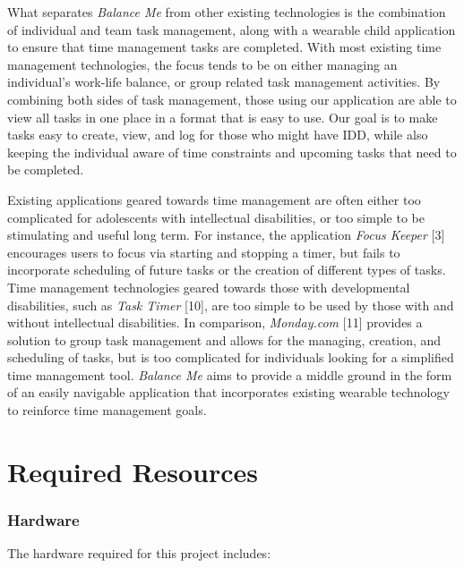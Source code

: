 \documentclass[12pt,letterpaper]{article}
\begin{document}
What separates \textit{Balance Me} from other existing technologies is the combination of individual and team task management, along with a wearable child application to ensure that time management tasks are completed. With most existing time management technologies, the focus tends to be on either managing an individual’s work-life balance, or group related task management activities. By combining both sides of task management, those using our application are able to view all tasks in one place in a format that is easy to use. Our goal is to make tasks easy to create, view, and log for those who might have IDD, while also keeping the individual aware of time constraints and upcoming tasks that need to be completed.

Existing applications geared towards time management are often either too complicated for adolescents with intellectual disabilities, or too simple to be stimulating and useful long term. For instance, the application \textit{Focus Keeper} [3] encourages users to focus via starting and stopping a timer, but fails to incorporate scheduling of future tasks or the creation of different types of tasks. Time management technologies geared towards those with developmental disabilities, such as \textit{Task Timer} [10], are too simple to be used by those with and without intellectual disabilities. In comparison, \textit{Monday.com} [11] provides a solution to group task management and allows for the managing, creation, and scheduling of tasks, but is too complicated for individuals looking for a simplified time management tool. \textit{Balance Me} aims to provide a middle ground in the form of an easily navigable application that incorporates existing wearable technology to reinforce time management goals.



\newpage
\section{Required Resources} 

\subsubsection*{Hardware}

\noindent
The hardware required for this project includes:
\end{document}
